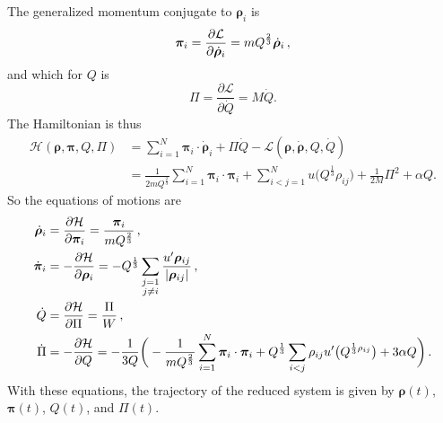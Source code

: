 The generalized momentum conjugate to $\bm{\rho}_i$ is
\begin{equation}
	\bm{\pi}_i = \frac{ \partial \mathcal{L} }{ \partial \dot{ \bm{\rho} }_i } =
	m Q^{\frac{ 2 }{ 3 }} \dot{\bm{\rho}}_i \thinspace,
\end{equation}
and which for $Q$ is
\begin{equation}
	\Pi = \frac{ \partial \mathcal{L} }{ \partial \dot{Q} } = M \dot{ Q }.
\end{equation}
The Hamiltonian is thus
\begin{equation}
	\begin{split}
		\mathcal{H}(\bm{\rho}, \bm{\pi}, Q, \Pi) &= \sum_{i=1}^{N} \bm{\pi}_i \cdot
		\dot{ \bm{\rho} }_i + \Pi \dot{ Q } - \mathcal{L}
		(\bm{\rho}, \dot{\bm{\rho}}, Q, \dot{ Q })\\
		&= \frac{ 1 }{ 2 m Q^{\frac{ 2 }{ 3 }} }
		\sum_{i=1}^{N} \bm{\pi}_i \cdot \bm{\pi}_i
		+ \sum_{i<j=1}^{N} u\big(Q^{\frac{ 1 }{ 3 }} \rho_{ij}\big) + \frac{ 1 }{ 2 M }
		\Pi^2 + \alpha Q.
	\end{split}
\end{equation}
So the equations of motions are
\begin{align}
	\dot{ \bm{\rho} }_i & = \frac{ \partial \mathcal{H} }{ \partial \bm{\pi}_i } =
	\frac{ \bm{\pi}_i }{ m Q^{\frac{ 2 }{ 3 }} } \thinspace,                          \\
	\dot{ \bm{\pi} }_i  & = - \frac{ \partial \mathcal{H} }{ \partial \bm{\rho}_i } =
	- Q^{\frac{ 1 }{ 3 }} \sum_{\substack{j=1                                         \\j\neq i}}
	\frac{ u' \bm{\rho}_{ij} }{ \lvert \bm{\rho}_{ij} \rvert  } \thinspace,           \\
	\dot{ Q }           & = \frac{ \partial \mathcal{H} }{ \partial \Pi } =
	\frac{ \Pi }{ W } \thinspace,                                                     \\
	\dot{ \Pi }         & = - \frac{ \partial \mathcal{H} }{ \partial Q } =
	- \frac{ 1 }{ 3Q } \bigg(
	- \frac{ 1 }{ m Q^{\frac{ 2 }{ 3 }} }	\sum_{i=1}^{N} \bm{\pi}_i \cdot \bm{\pi}_i
	+ Q^{\frac{ 1 }{ 3 }} \sum_{i<j} \rho_{ij} u'\big(Q^{\frac{ 1 }{ 3 } \rho_{ij}}\big) +
	3 \alpha Q
	\bigg) \thinspace.
\end{align}
With these equations, the trajectory of the reduced system is given by
$\bm{\rho}(t)$, $\bm{\pi}(t)$, $Q(t)$, and $\Pi(t)$.


